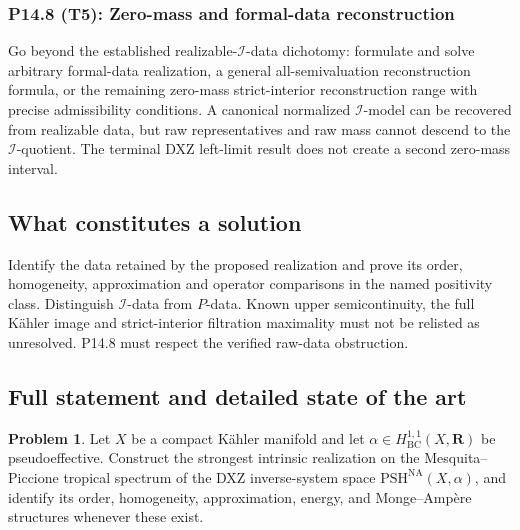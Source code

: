 \documentclass[11pt,a4paper]{article}
\theoremstyle{definition}
\newtheorem{problem}{Problem}[section]
\theoremstyle{remark}
\newcommand{\NA}{\mathrm{NA}}
\newcommand{\PSH}{\mathrm{PSH}}
\begin{document}
\subsubsection*{P14.8 (T5): Zero-mass and formal-data reconstruction}
\label{atom:P14.8}
Go beyond the established realizable-\(\mathcal I\)-data dichotomy: formulate and solve arbitrary formal-data realization, a general all-semivaluation reconstruction formula, or the remaining zero-mass strict-interior reconstruction range with precise admissibility conditions. A canonical normalized \(\mathcal I\)-model can be recovered from realizable data, but raw representatives and raw mass cannot descend to the \(\mathcal I\)-quotient. The terminal DXZ left-limit result does not create a second zero-mass interval.

\subsection{What constitutes a solution}
Identify the data retained by the proposed realization and prove its order, homogeneity, approximation and operator comparisons in the named positivity class. Distinguish \(\mathcal I\)-data from \(P\)-data. Known upper semicontinuity, the full K\"ahler image and strict-interior filtration maximality must not be relisted as unresolved. P14.8 must respect the verified raw-data obstruction.

\subsection{Full statement and detailed state of the art}
\label{sec:ch72-mp-pseff}

\begin{problem}\label{prob:frontier-mp-pseff}
Let \(X\) be a compact Kähler manifold and let
\(\alpha\in H^{1,1}_{\mathrm{BC}}(X,\mathbf R)\) be pseudoeffective.
Construct the strongest intrinsic realization on the Mesquita--Piccione
tropical spectrum of the DXZ inverse-system space
\(\PSH^{\NA}(X,\alpha)\), and identify its order, homogeneity,
approximation, energy, and Monge--Ampère structures whenever these exist.
\end{problem}
\end{document}
